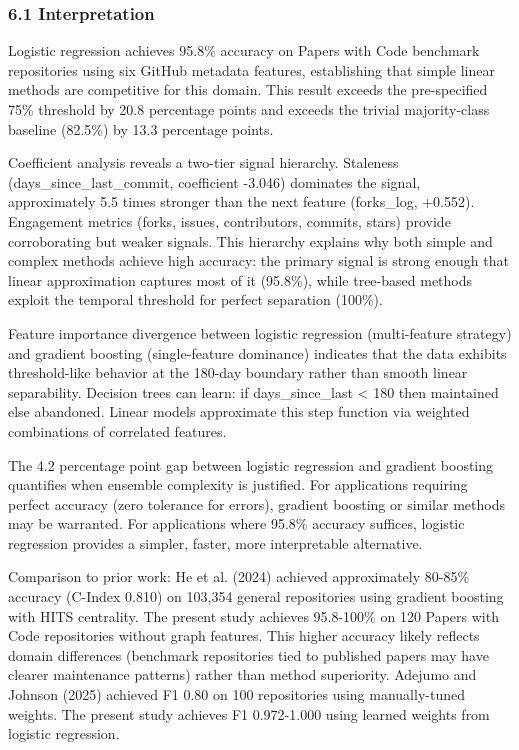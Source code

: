 
\subsubsection{6.1 Interpretation}

Logistic regression achieves 95.8\% accuracy on Papers with Code benchmark repositories using six GitHub metadata features, establishing that simple linear methods are competitive for this domain. This result exceeds the pre-specified 75\% threshold by 20.8 percentage points and exceeds the trivial majority-class baseline (82.5\%) by 13.3 percentage points.

Coefficient analysis reveals a two-tier signal hierarchy. Staleness (days\_since\_last\_commit, coefficient -3.046) dominates the signal, approximately 5.5 times stronger than the next feature (forks\_log, +0.552). Engagement metrics (forks, issues, contributors, commits, stars) provide corroborating but weaker signals. This hierarchy explains why both simple and complex methods achieve high accuracy: the primary signal is strong enough that linear approximation captures most of it (95.8\%), while tree-based methods exploit the temporal threshold for perfect separation (100\%).

Feature importance divergence between logistic regression (multi-feature strategy) and gradient boosting (single-feature dominance) indicates that the data exhibits threshold-like behavior at the 180-day boundary rather than smooth linear separability. Decision trees can learn: if days\_since\_last < 180 then maintained else abandoned. Linear models approximate this step function via weighted combinations of correlated features.

The 4.2 percentage point gap between logistic regression and gradient boosting quantifies when ensemble complexity is justified. For applications requiring perfect accuracy (zero tolerance for errors), gradient boosting or similar methods may be warranted. For applications where 95.8\% accuracy suffices, logistic regression provides a simpler, faster, more interpretable alternative.

Comparison to prior work: He et al. (2024) achieved approximately 80-85\% accuracy (C-Index 0.810) on 103,354 general repositories using gradient boosting with HITS centrality. The present study achieves 95.8-100\% on 120 Papers with Code repositories without graph features. This higher accuracy likely reflects domain differences (benchmark repositories tied to published papers may have clearer maintenance patterns) rather than method superiority. Adejumo and Johnson (2025) achieved F1 0.80 on 100 repositories using manually-tuned weights. The present study achieves F1 0.972-1.000 using learned weights from logistic regression.

